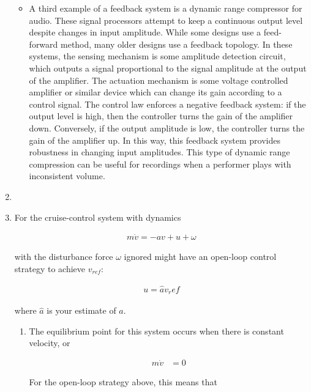 \documentclass[11pt]{article}
\theoremstyle{definition}
\begin{document}
\begin{enumerate}
\begin{itemize}
        \item A third example of a feedback system is a dynamic range compressor for audio.  These signal processors attempt to keep a continuous output level despite changes in input amplitude.  While some designs use a feed-forward method, many older designs use a feedback topology.  In these systems, the sensing mechanism is some amplitude detection circuit, which outputs a signal proportional to the signal amplitude at the output of the amplifier.  The actuation mechanism is some voltage controlled amplifier or similar device which can change its gain according to a control signal.  The control law enforces a negative feedback system: if the output level is high, then the controller turns the gain of the amplifier down.  Conversely, if the output amplitude is low, the controller turns the gain of the amplifier up.  In this way, this feedback system provides robustness in changing input amplitudes.  This type of dynamic range compression can be useful for recordings when a performer plays with inconsistent volume.
    \end{itemize}
    
    \item %
    
    \item %
    
    For the cruise-control system with dynamics
    
    \begin{align*}
        m\dot{v} = -av + u + \omega
    \end{align*}
    
    with the disturbance force $\omega$ ignored might have an open-loop control strategy to achieve $v_{ref}$:
    
    \begin{align*}
        u = \hat{a}v_ref
    \end{align*}
    
    where $\hat{a}$ is your estimate of $a$.
    
    \begin{enumerate}
        \item %
        The equilibrium point for this system occurs when there is constant velocity, or
        
        \begin{align*}
            m\dot{v} &= 0
        \end{align*}
        
        For the open-loop strategy above, this means that
        

\end{enumerate}
\end{enumerate}
\end{document}
